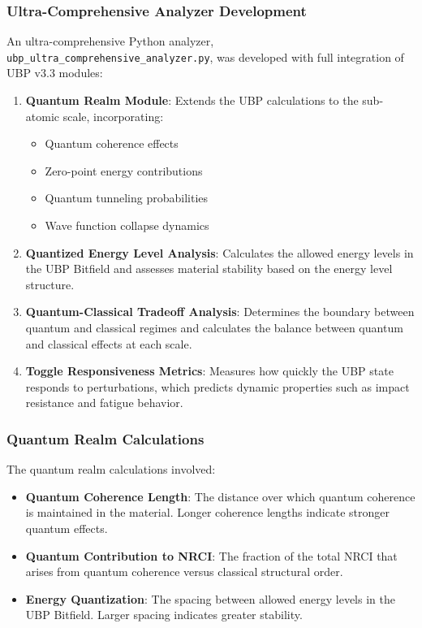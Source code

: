 \documentclass[11pt,a4paper]{article}
\begin{document}
\subsubsection{Ultra-Comprehensive Analyzer Development}

An ultra-comprehensive Python analyzer, \texttt{ubp\_ultra\_comprehensive\_analyzer.py}, was developed with full integration of UBP v3.3 modules:

\begin{enumerate}
    \item \textbf{Quantum Realm Module}: Extends the UBP calculations to the sub-atomic scale, incorporating:
    \begin{itemize}
        \item Quantum coherence effects
        \item Zero-point energy contributions
        \item Quantum tunneling probabilities
        \item Wave function collapse dynamics
    \end{itemize}
    
    \item \textbf{Quantized Energy Level Analysis}: Calculates the allowed energy levels in the UBP Bitfield and assesses material stability based on the energy level structure.
    
    \item \textbf{Quantum-Classical Tradeoff Analysis}: Determines the boundary between quantum and classical regimes and calculates the balance between quantum and classical effects at each scale.
    
    \item \textbf{Toggle Responsiveness Metrics}: Measures how quickly the UBP state responds to perturbations, which predicts dynamic properties such as impact resistance and fatigue behavior.
\end{enumerate}

\subsubsection{Quantum Realm Calculations}

The quantum realm calculations involved:

\begin{itemize}
    \item \textbf{Quantum Coherence Length}: The distance over which quantum coherence is maintained in the material. Longer coherence lengths indicate stronger quantum effects.
    
    \item \textbf{Quantum Contribution to NRCI}: The fraction of the total NRCI that arises from quantum coherence versus classical structural order.
    
    \item \textbf{Energy Quantization}: The spacing between allowed energy levels in the UBP Bitfield. Larger spacing indicates greater stability.
\end{itemize}
\end{document}
